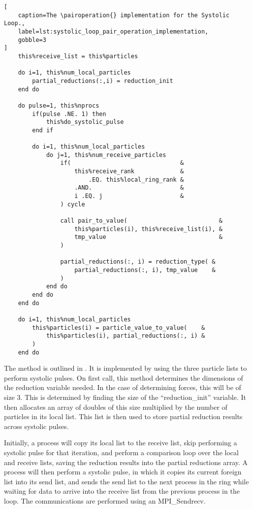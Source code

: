 \begin{lstlisting}[
    caption=The \pairoperation{} implementation for the Systolic Loop.,
    label=lst:systolic_loop_pair_operation_implementation,
    gobble=3
]
    this%receive_list = this%particles

    do i=1, this%num_local_particles
        partial_reductions(:,i) = reduction_init
    end do

    do pulse=1, this%nprocs
        if(pulse .NE. 1) then
            this%do_systolic_pulse
        end if

        do i=1, this%num_local_particles
            do j=1, this%num_receive_particles
                if(                               &
                    this%receive_rank             &
                        .EQ. this%local_ring_rank &
                    .AND.                         &
                    i .EQ. j                      &
                ) cycle

                call pair_to_value(                          &
                    this%particles(i), this%receive_list(i), &
                    tmp_value                                &
                )

                partial_reductions(:, i) = reduction_type( &
                    partial_reductions(:, i), tmp_value    &
                )
            end do
        end do
    end do

    do i=1, this%num_local_particles
        this%particles(i) = particle_value_to_value(    &
            this%particles(i), partial_reductions(:, i) &
        )
    end do
\end{lstlisting}

The \pairoperation{} method is outlined in
.
It is implemented by using the three
particle lists to perform systolic pulses.
%
On first call, this method determines the dimensions of the
reduction variable needed.
%
In the case of determining forces, this will be of size 3.
%
This is determined by finding the size of the ``reduction\_init''
variable.
%
It then allocates an array of doubles of this size multiplied by the
number of particles in its local list.
%
This list is then used to store partial reduction results across
systolic pulses.

Initially, a process will copy its local list to the receive list,
skip performing a systolic pulse for that iteration, and perform
a comparison loop over the local and receive lists, saving the
reduction results into the partial reductions array.
%
A process will then perform a systolic pulse, in which it copies its
current foreign list into its send list, and sends the send list to
the next process in the ring while waiting for data to arrive 
into the receive list from the previous process in the loop.
%
The communications are performed using an MPI\_Sendrecv.

